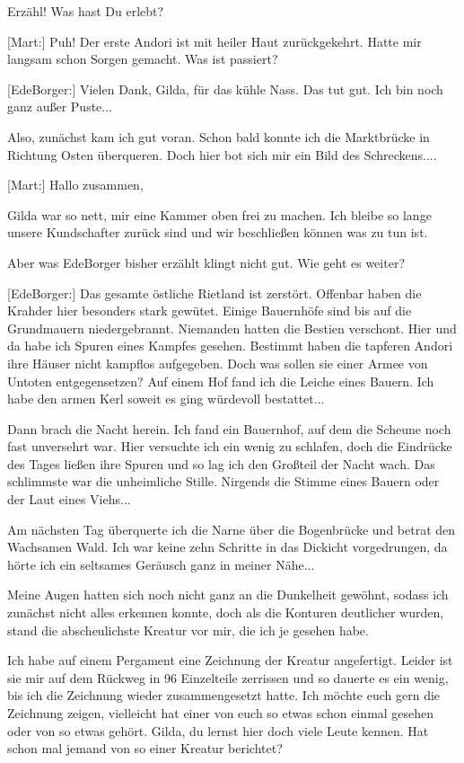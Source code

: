\documentclass[10pt, a4paper, oneside]{book}
\begin{document}
\begin{multicols}{2}
Erzähl! Was hast Du erlebt?

[Mart:] Puh! Der erste Andori ist mit heiler Haut zurückgekehrt. Hatte mir langsam schon Sorgen gemacht. Was ist passiert?

[EdeBorger:] Vielen Dank, Gilda, für das kühle Nass. Das tut gut. Ich bin noch ganz außer Puste...

Also, zunächst kam ich gut voran. Schon bald konnte ich die Marktbrücke in Richtung Osten überqueren. Doch hier bot sich mir ein Bild des Schreckens....

[Mart:] Hallo zusammen,

Gilda war so nett, mir eine Kammer oben frei zu machen. Ich bleibe so lange unsere Kundschafter zurück sind und wir beschließen können was zu tun ist.

Aber was EdeBorger bisher erzählt klingt nicht gut. Wie geht es weiter?

[EdeBorger:] Das gesamte östliche Rietland ist zerstört. Offenbar haben die Krahder hier besonders stark gewütet. Einige Bauernhöfe sind bis auf die Grundmauern niedergebrannt. Niemanden hatten die Bestien verschont. Hier und da habe ich Spuren eines Kampfes gesehen. Bestimmt haben die tapferen Andori ihre Häuser nicht kampflos aufgegeben. Doch was sollen sie einer Armee von Untoten entgegensetzen? Auf einem Hof fand ich die Leiche eines Bauern. Ich habe den armen Kerl soweit es ging würdevoll bestattet...

Dann brach die Nacht herein. Ich fand ein Bauernhof, auf dem die Scheune noch fast unversehrt war. Hier versuchte ich ein wenig zu schlafen, doch die Eindrücke des Tages ließen ihre Spuren und so lag ich den Großteil der Nacht wach. Das schlimmste war die unheimliche Stille. Nirgends die Stimme eines Bauern oder der Laut eines Viehs...

Am nächsten Tag überquerte ich die Narne über die Bogenbrücke und betrat den Wachsamen Wald. Ich war keine zehn Schritte in das Dickicht vorgedrungen, da hörte ich ein seltsames Geräusch ganz in meiner Nähe... 

Meine Augen hatten sich noch nicht ganz an die Dunkelheit gewöhnt, sodass ich zunächst nicht alles erkennen konnte, doch als die Konturen deutlicher wurden, stand die abscheulichste Kreatur vor mir, die ich je gesehen habe.

Ich habe auf einem Pergament eine Zeichnung der Kreatur angefertigt. Leider ist sie mir auf dem Rückweg in 96 Einzelteile zerrissen und so dauerte es ein wenig, bis ich die Zeichnung wieder zusammengesetzt hatte. Ich möchte euch gern die Zeichnung zeigen, vielleicht hat einer von euch so etwas schon einmal gesehen oder von so etwas gehört. Gilda, du lernst hier doch viele Leute kennen. Hat schon mal jemand von so einer Kreatur berichtet?


\end{multicols}
\end{document}
